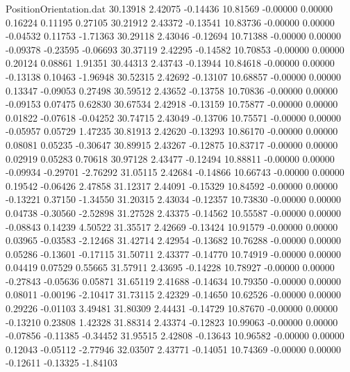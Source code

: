 \begin{filecontents}{PositionOrientation.dat}
  30.13918    2.42075   -0.14436    10.81569   -0.00000    0.00000    0.16224    0.11195    0.27105
  30.21912    2.43372   -0.13541    10.83736   -0.00000    0.00000   -0.04532    0.11753   -1.71363
  30.29118    2.43046   -0.12694    10.71388   -0.00000    0.00000   -0.09378   -0.23595   -0.06693
  30.37119    2.42295   -0.14582    10.70853   -0.00000    0.00000    0.20124    0.08861    1.91351
  30.44313    2.43743   -0.13944    10.84618   -0.00000    0.00000   -0.13138    0.10463   -1.96948
  30.52315    2.42692   -0.13107    10.68857   -0.00000    0.00000    0.13347   -0.09053    0.27498
  30.59512    2.43652   -0.13758    10.70836   -0.00000    0.00000   -0.09153    0.07475    0.62830
  30.67534    2.42918   -0.13159    10.75877   -0.00000    0.00000    0.01822   -0.07618   -0.04252
  30.74715    2.43049   -0.13706    10.75571   -0.00000    0.00000   -0.05957    0.05729    1.47235
  30.81913    2.42620   -0.13293    10.86170   -0.00000    0.00000    0.08081    0.05235   -0.30647
  30.89915    2.43267   -0.12875    10.83717   -0.00000    0.00000    0.02919    0.05283    0.70618
  30.97128    2.43477   -0.12494    10.88811   -0.00000    0.00000   -0.09934   -0.29701   -2.76292
  31.05115    2.42684   -0.14866    10.66743   -0.00000    0.00000    0.19542   -0.06426    2.47858
  31.12317    2.44091   -0.15329    10.84592   -0.00000    0.00000   -0.13221    0.37150   -1.34550
  31.20315    2.43034   -0.12357    10.73830   -0.00000    0.00000    0.04738   -0.30560   -2.52898
  31.27528    2.43375   -0.14562    10.55587   -0.00000    0.00000   -0.08843    0.14239    4.50522
  31.35517    2.42669   -0.13424    10.91579   -0.00000    0.00000    0.03965   -0.03583   -2.12468
  31.42714    2.42954   -0.13682    10.76288   -0.00000    0.00000    0.05286   -0.13601   -0.17115
  31.50711    2.43377   -0.14770    10.74919   -0.00000    0.00000    0.04419    0.07529    0.55665
  31.57911    2.43695   -0.14228    10.78927   -0.00000    0.00000   -0.27843   -0.05636    0.05871
  31.65119    2.41688   -0.14634    10.79350   -0.00000    0.00000    0.08011   -0.00196   -2.10417
  31.73115    2.42329   -0.14650    10.62526   -0.00000    0.00000    0.29226   -0.01103    3.49481
  31.80309    2.44431   -0.14729    10.87670   -0.00000    0.00000   -0.13210    0.23808    1.42328
  31.88314    2.43374   -0.12823    10.99063   -0.00000    0.00000   -0.07856   -0.11385   -0.34452
  31.95515    2.42808   -0.13643    10.96582   -0.00000    0.00000    0.12043   -0.05112   -2.77946
  32.03507    2.43771   -0.14051    10.74369   -0.00000    0.00000   -0.12611   -0.13325   -1.84103

\end{filecontents}
